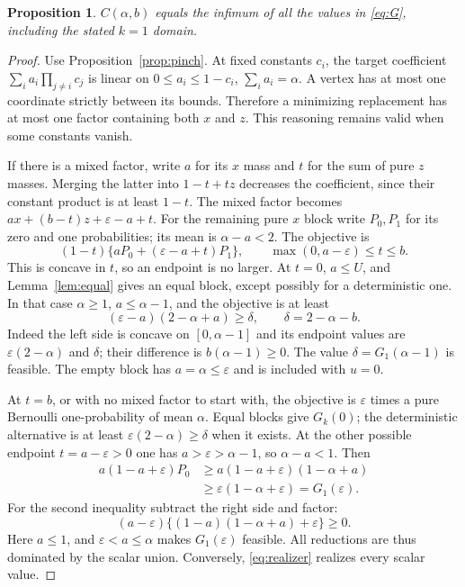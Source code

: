 \documentclass[11pt]{article}
\newtheorem{proposition}[theorem]{Proposition}
\newcommand{\eps}{\varepsilon}
\begin{document}
\begin{proposition}\label{prop:scalar}
$C(\alpha,b)$ equals the infimum of all the values in \eqref{eq:G},
including the stated $k=1$ domain.
\end{proposition}
\begin{proof}
Use Proposition~\ref{prop:pinch}. At fixed constants $c_i$, the target
coefficient $\sum_i a_i\prod_{j\ne i}c_j$ is linear on
$0\le a_i\le1-c_i$, $\sum_i a_i=\alpha$. A vertex has at most one
coordinate strictly between its bounds. Therefore a minimizing
replacement has at most one factor containing both $x$ and $z$.
This reasoning remains valid when some constants vanish.

If there is a mixed factor, write $a$ for its $x$ mass and $t$ for the
sum of pure $z$ masses. Merging the latter into $1-t+tz$ decreases the
coefficient, since their constant product is at least $1-t$. The mixed
factor becomes $ax+(b-t)z+\eps-a+t$. For the remaining pure $x$ block
write $P_0,P_1$ for its zero and one probabilities; its mean is
$\alpha-a<2$. The objective is
\[
 (1-t)\{aP_0+(\eps-a+t)P_1\},\qquad
 \max(0,a-\eps)\le t\le b.
\]
This is concave in $t$, so an endpoint is no larger.
At $t=0$, $a\le U$, and Lemma~\ref{lem:equal} gives an equal block,
except possibly for a deterministic one. In that case $\alpha\ge1$,
$a\le\alpha-1$, and the objective is at least
\[
 (\eps-a)(2-\alpha+a)\ge\delta,
 \qquad \delta=2-\alpha-b.
\]
Indeed the left side is concave on $[0,\alpha-1]$ and its endpoint
values are $\eps(2-\alpha)$ and $\delta$; their difference is
$b(\alpha-1)\ge0$. The value $\delta=G_1(\alpha-1)$ is feasible.
The empty block has $a=\alpha\le\eps$ and is included with $u=0$.

At $t=b$, or with no mixed factor to start with, the objective is
$\eps$ times a pure Bernoulli one-probability of mean $\alpha$.
Equal blocks give $G_k(0)$; the deterministic alternative is at least
$\eps(2-\alpha)\ge\delta$ when it exists.
At the other possible endpoint $t=a-\eps>0$ one has
$a>\eps>\alpha-1$, so $\alpha-a<1$. Then
\begin{align*}
 a(1-a+\eps)P_0&\ge a(1-a+\eps)(1-\alpha+a)\\
 &\ge\eps(1-\alpha+\eps)=G_1(\eps).
\end{align*}
For the second inequality subtract the right side and factor:
\[
 (a-\eps)\{(1-a)(1-\alpha+a)+\eps\}\ge0.
\]
Here $a\le1$, and $\eps<a\le\alpha$ makes $G_1(\eps)$ feasible.
All reductions are thus dominated by the scalar union. Conversely,
\eqref{eq:realizer} realizes every scalar value.
\end{proof}
\end{document}
